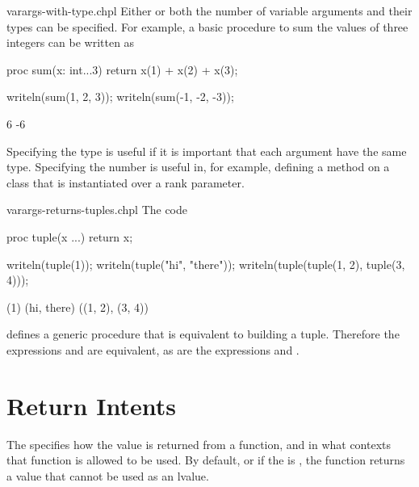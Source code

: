 \begin{chapelexample}{varargs-with-type.chpl}
Either or both the number of variable arguments and their types can be
specified.  For example, a basic procedure to sum the values of three
integers can be written as
\begin{chapel}
proc sum(x: int...3) return x(1) + x(2) + x(3);
\end{chapel}
\begin{chapelpost}
writeln(sum(1, 2, 3));
writeln(sum(-1, -2, -3));
\end{chapelpost}
\begin{chapeloutput}
6
-6
\end{chapeloutput}
Specifying the type is useful if it is important that each argument
have the same type.  Specifying the number is useful in, for example,
defining a method on a class that is instantiated over a rank
parameter.
\end{chapelexample}

\begin{chapelexample}{varargs-returns-tuples.chpl}
The code
\begin{chapel}
proc tuple(x ...) return x;
\end{chapel}
\begin{chapelpost}
writeln(tuple(1));
writeln(tuple("hi", "there"));
writeln(tuple(tuple(1, 2), tuple(3, 4)));
\end{chapelpost}
\begin{chapeloutput}
(1)
(hi, there)
((1, 2), (3, 4))
\end{chapeloutput}
defines a generic procedure that is equivalent to building a tuple.
Therefore the expressions  and  are equivalent,
as are the expressions  and .
\end{chapelexample}


\section{Return Intents}
\label{Return_Intent}

The  specifies how the value is returned from a function,
and in what contexts that function is allowed to be used.  By default, or if
the  is , the function returns a value that
cannot be used as an lvalue.


